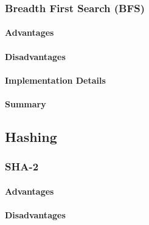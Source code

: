 \subsubsection{Breadth First Search (BFS)}

\paragraph{Advantages}
\paragraph{Disadvantages}

\paragraph{Implementation Details}

\paragraph{Summary}


\subsection{Hashing}


\subsubsection{SHA-2}

\paragraph{Advantages}
\paragraph{Disadvantages}

